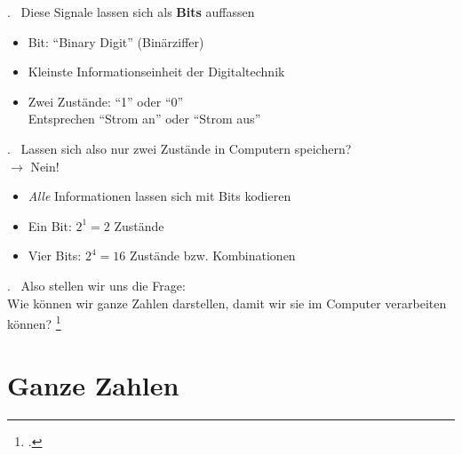 \documentclass{beamer}
\newcommand{\subsecframe}{\begin{frame}{\insertsectionnumber.\insertsubsectionnumber \ \insertsubsection}}
\begin{document}
        \subsecframe
            Diese Signale lassen sich als \textbf{Bits} auffassen
            \begin{itemize}
                \item Bit: ``Binary Digit'' (Binärziffer)
                \item Kleinste Informationseinheit der Digitaltechnik
                \item Zwei Zustände: ``1'' oder ``0'' \\
                    Entsprechen ``Strom an'' oder ``Strom aus''
            \end{itemize}
        \end{frame}

        \subsecframe
            Lassen sich also nur zwei Zustände in Computern speichern? 
            \\ $\rightarrow$ Nein!
            \begin{itemize}
                \item \textit{Alle} Informationen lassen sich mit Bits kodieren
                \item Ein Bit: $2^1 = 2$ Zustände
                \item Vier Bits: $2^4 = 16$ Zustände bzw. Kombinationen
            \end{itemize}
        \end{frame}

        \subsecframe
            Also stellen wir uns die Frage: \\
            Wie können wir ganze Zahlen darstellen, damit wir sie im Computer verarbeiten können? \footcite[Der Vortrag hierzu basiert auf:][]{hougardy2018}
        \end{frame}

\section{Ganze Zahlen}
\end{document}
